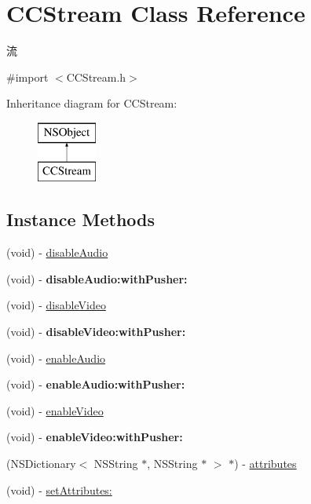 \hypertarget{interface_c_c_stream}{}\section{C\+C\+Stream Class Reference}
\label{interface_c_c_stream}


流  




{\ttfamily \#import $<$C\+C\+Stream.\+h$>$}

Inheritance diagram for C\+C\+Stream\+:\begin{figure}[H]
\begin{center}
\leavevmode
\includegraphics[height=2.000000cm]{interface_c_c_stream}
\end{center}
\end{figure}
\subsection*{Instance Methods}
\begin{DoxyCompactItemize}
\item 
(void) -\/ \hyperlink{interface_c_c_stream_a82cb1bf59990e92e5e99d369f610f514}{disable\+Audio}
\item 
\mbox{\label{interface_c_c_stream_a29473e7c05d0e6e5df2d4dbd70db41ba}} 
(void) -\/ {\bfseries disable\+Audio\+:with\+Pusher\+:}
\item 
(void) -\/ \hyperlink{interface_c_c_stream_ad9c015f527eb2836208f7176169dc9fc}{disable\+Video}
\item 
\mbox{\label{interface_c_c_stream_afd50892b70b7c0b10134e9947ed82346}} 
(void) -\/ {\bfseries disable\+Video\+:with\+Pusher\+:}
\item 
(void) -\/ \hyperlink{interface_c_c_stream_aec0c4aca5680b761e22dc1e66ad3e810}{enable\+Audio}
\item 
\mbox{\label{interface_c_c_stream_ac873f347358dcc3e5bd5f9274ae187e4}} 
(void) -\/ {\bfseries enable\+Audio\+:with\+Pusher\+:}
\item 
(void) -\/ \hyperlink{interface_c_c_stream_af74c6f172c227bf905a7ae22f05b38b4}{enable\+Video}
\item 
\mbox{\label{interface_c_c_stream_a163214339a6e01d9a0dd1bbd9728918c}} 
(void) -\/ {\bfseries enable\+Video\+:with\+Pusher\+:}
\item 
(N\+S\+Dictionary$<$ N\+S\+String $\ast$, N\+S\+String $\ast$ $>$ $\ast$) -\/ \hyperlink{interface_c_c_stream_a3688442340b99d3c28dcb1e0ed818de8}{attributes}
\item 
(void) -\/ \hyperlink{interface_c_c_stream_a3643903f78ac8220b16b926f779dfab4}{set\+Attributes\+:}
\end{DoxyCompactItemize}
